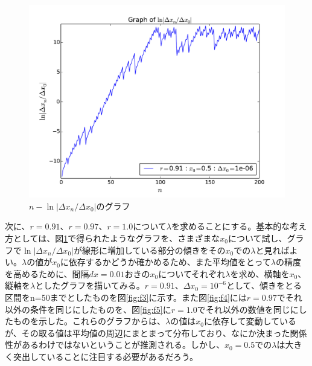 \documentclass{jsarticle}
\begin{document}
\begin{enumerate}
\begin{enumerate}
                \begin{figure}[H]   
                    \begin{center}
                        \includegraphics[width=12.5cm]{figure_1.pdf}
                        \caption{$n - \ln |\Delta x_{n} / \Delta x_{0} |$のグラフ}
                        \label{fig:f2}
                    \end{center}
                \end{figure}
                
                次に、$r=0.91$、$r=0.97$、$r=1.0$について$\lambda$を求めることにする。基本的な考え方としては、図\ref{fig:f2}で得られたようなグラフを、さまざまな$x_{0}$について試し、グラフで$\ln | \Delta x_{n} / \Delta x_{0} |$が線形に増加している部分の傾きをその$x_{0}$での$\lambda$と見ればよい。$\lambda$の値が$x_{0}$に依存するかどうか確かめるため、また平均値をとって$\lambda$の精度を高めるために、間隔$dx=0.01$おきの$x_{0}$についてそれぞれ$\lambda$を求め、横軸を$x_{0}$、縦軸を$\lambda$としたグラフを描いてみる。$r=0.91$、$\Delta x_{0}=10^{-6}$として、傾きをとる区間をn=50までとしたものを図\ref{fig:f3}に示す。また図\ref{fig:f4}には$r=0.97$でそれ以外の条件を同じにしたものを、図\ref{fig:f5}に$r=1.0$でそれ以外の数値を同じにしたものを示した。これらのグラフからは、$\lambda$の値は$x_{0}$に依存して変動しているが、その取る値は平均値の周辺にまとまって分布しており、なにか決まった関係性があるわけではないということが推測される。しかし、$x_{0}=0.5$での$\lambda$は大きく突出していることに注目する必要があるだろう。
                

\end{enumerate}
\end{enumerate}
\end{document}
